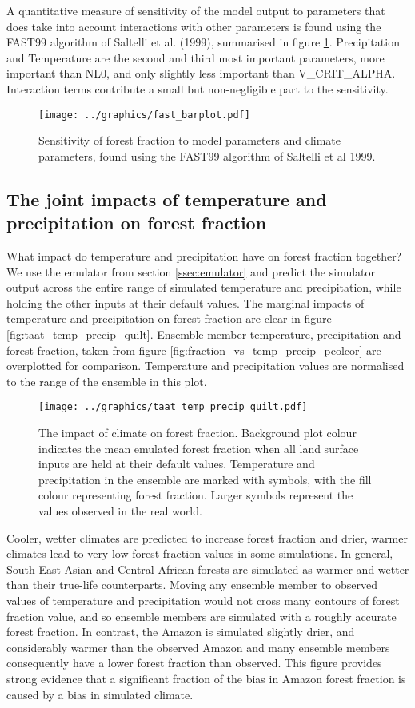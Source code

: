 \documentclass[gmd, manuscript]{copernicus}
\begin{document}
A quantitative measure of sensitivity of the model output to parameters that does take into account interactions with other parameters is found using the FAST99 algorithm of Saltelli et al. (1999), summarised in figure \ref{fig:fast_barplot}. Precipitation and Temperature are the second and third most important parameters, more important than NL0, and only slightly less important than V\_CRIT\_ALPHA. Interaction terms contribute a small but non-negligible part to the sensitivity.

\begin{figure}[t]
\texttt{[image: ../graphics/fast\_barplot.pdf]}
\caption{Sensitivity of forest fraction to model parameters and climate parameters, found using the FAST99 algorithm of Saltelli et al 1999.
}
\label{fig:fast_barplot}
\end{figure}

\subsection{The joint impacts of temperature and precipitation on forest fraction}
What impact do temperature and precipitation have on forest fraction together? We use the emulator from section \ref{ssec:emulator} and predict the simulator output across the entire range of simulated temperature and precipitation, while holding the other inputs at their default values. The marginal impacts of temperature and precipitation on forest fraction are clear in figure \ref{fig:taat_temp_precip_quilt}. Ensemble member temperature, precipitation and forest fraction, taken from figure \ref{fig:fraction_vs_temp_precip_pcolcor} are overplotted for comparison. Temperature and precipitation values are normalised to the range of the ensemble in this plot.

\begin{figure}[t]
\texttt{[image: ../graphics/taat\_temp\_precip\_quilt.pdf]}
\caption{The impact of climate on forest fraction. Background plot colour indicates the mean emulated forest fraction when all land surface inputs are held at their default values. Temperature and precipitation in the ensemble are marked with symbols, with the fill colour representing forest fraction. Larger symbols represent the values observed in the real world.
}
\label{fig:fig:taat_temp_precip_quilt}
\end{figure}

Cooler, wetter climates are predicted to increase forest fraction and drier, warmer climates lead to very low forest fraction values in some simulations. In general, South East Asian and Central African forests are simulated as warmer and wetter than their true-life counterparts. Moving any ensemble member to observed values of temperature and precipitation would not cross many contours of forest fraction value, and so ensemble members are simulated with a roughly accurate forest fraction. In contrast, the Amazon is simulated slightly drier, and considerably warmer than the observed Amazon and many ensemble members consequently have a lower forest fraction than observed. This figure provides strong evidence that a significant fraction of the bias in Amazon forest fraction is caused by a bias in simulated climate.
\end{document}
